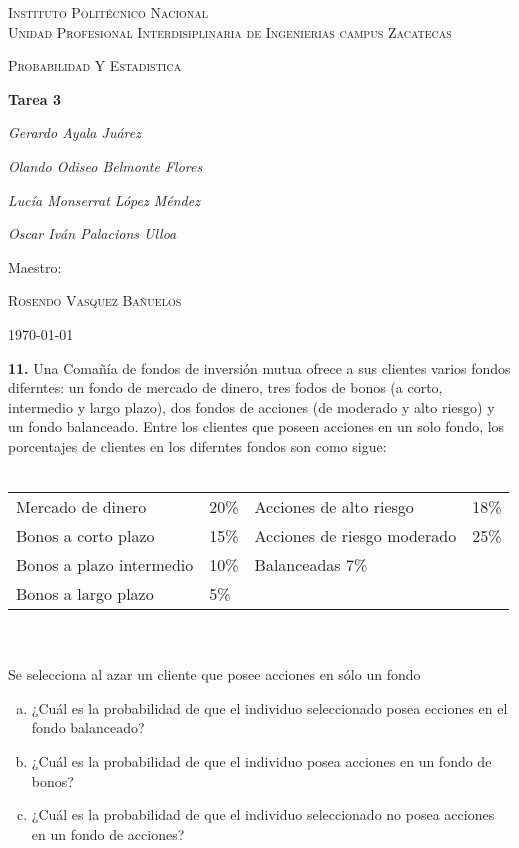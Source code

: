 \documentclass[12pt, letterpaper, spanish]{article}
\begin{document}
\begin{titlepage}
	\centering
	{\scshape\LARGE Instituto Politécnico Nacional\\ Unidad Profesional Interdisiplinaria de Ingenierias campus Zacatecas\par}
	\vspace{1cm}
	{\scshape\Large Probabilidad Y Estadistica\par}
	\vspace{1.5cm}
	{\huge\bfseries Tarea 3\par}
	\vspace{2cm}
	{\Large\itshape Gerardo Ayala Juárez\par}
	{\Large\itshape Olando Odiseo Belmonte Flores\par}
	{\Large\itshape Lucía Monserrat López Méndez\par}
	{\Large\itshape Oscar Iván Palacions Ulloa\par}
	\vfill
	Maestro:\par
	\textsc{
	Rosendo Vasquez Bañuelos}
	\vfill
	{\large \today \par}
\end{titlepage}

\textbf{11.} Una Comañía de fondos de inversión mutua ofrece a sus clientes varios fondos diferntes: un fondo de mercado de dinero, tres fodos de bonos (a corto, intermedio y largo plazo), dos fondos de acciones (de moderado y alto riesgo) y un fondo balanceado. Entre los clientes que poseen acciones en un solo fondo, los porcentajes de clientes en los diferntes fondos son como sigue:\\ \\

\begin{tabular}{llll}
    Mercado de dinero & 20\% & Acciones de alto riesgo & 18\% \\
    Bonos a corto plazo & 15\% & Acciones de riesgo moderado & 25\% \\
    Bonos a plazo intermedio & 10\% & Balanceadas 7\% \\
    Bonos a largo plazo & 5\%
\end{tabular}\\ \\
Se selecciona al azar un cliente que posee acciones en sólo un fondo
\begin{enumerate}[a)]
    \item ¿Cuál es la probabilidad de que el individuo seleccionado posea ecciones en el fondo balanceado?
    \item ¿Cuál es la probabilidad de que el individuo posea acciones en un fondo de bonos?
    \item ¿Cuál es la probabilidad de que el individuo seleccionado no posea acciones en un fondo de acciones?
\end{enumerate} \\ \\ \\
\end{document}
